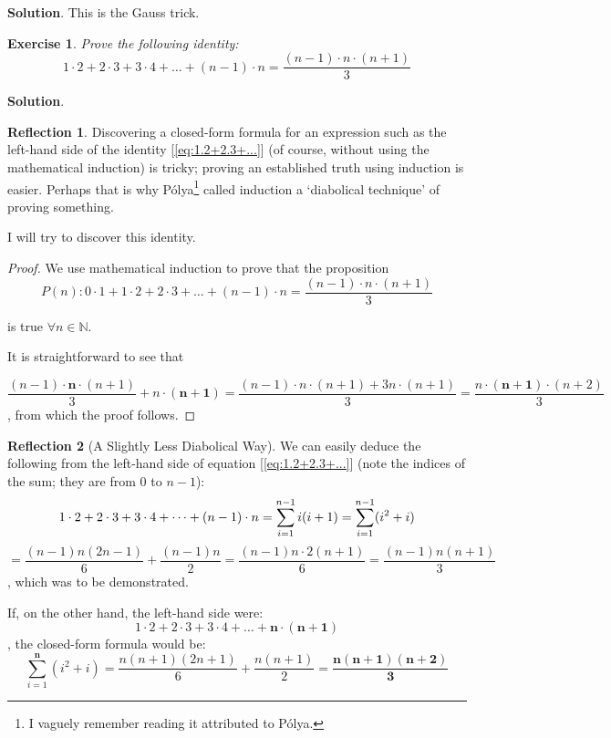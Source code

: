 \documentclass[11pt]{book}
\theoremstyle{definition}
\theoremstyle{plain}
\newtheorem{exercise}{Exercise}
\theoremstyle{definition}
\theoremstyle{problemstyle}
\theoremstyle{remark}
\theoremstyle{definition}
\newtheorem{reflection}{Reflection}
\begin{document}
\textbf{Solution}.
This is the Gauss trick.
\begin{exercise}
    \label{ex:2.1.5}
    Prove the following identity:
    \begin{equation}
        \label{eq:1.2+2.3+...}
        1\cdot2+2\cdot3+3\cdot4+\dots+(n-1)\cdot n=\frac{(n-1)\cdot n\cdot(n+1)}{3}
    \end{equation}
\end{exercise}
\textbf{Solution}.
\begin{reflection}
    Discovering a closed-form formula for an expression such as the left-hand side of the identity [\ref{eq:1.2+2.3+...}] (of course, without using the mathematical induction) is tricky; proving an established truth using induction is easier. Perhaps that is why P\'olya\footnote{I vaguely remember reading it attributed to P\'olya.} called induction a `diabolical technique' of proving something. 

    I will try to discover this identity.
\end{reflection}
\begin{proof}
    We use mathematical induction to prove that the proposition 
    \[
        P(n):0\cdot1+1\cdot2+2\cdot3+\dots+(n-1)\cdot n=\frac{(n-1)\cdot n\cdot(n+1)}{3}
    \]

    is true $\forall n\in\mathbb{N}$.

    It is straightforward to see that

    \[
        \frac{(n-1)\cdot\boldsymbol{n}\cdot(n+1)}{3}+n\cdot\boldsymbol{(n+1)}=\frac{(n-1)\cdot n\cdot(n+1)+3n\cdot(n+1)}{3}=\frac{n\cdot\boldsymbol{(n+1)}\cdot(n+2)}{3}
    \]
    , from which the proof follows.
\end{proof}

\begin{reflection}[A Slightly Less Diabolical Way]
    We can easily deduce the following from the left-hand side of equation [\ref{eq:1.2+2.3+...}] (note the indices of the sum; they are from $0$ to $n-1$):
    \begin{equation*}
        1\cdot2+2\cdot3+3\cdot4+\dots+(n-1)\cdot n=\sum_{i=1}^{n-1}i(i+1)=\sum_{i=1}^{n-1}(i^2+i)\\
    \end{equation*}
    \begin{equation*}
        =\frac{(n-1)n(2n-1)}{6}+\frac{(n-1)n}{2}=\frac{(n-1)n\cdot2(n+1)}{6}=\frac{(n-1)n(n+1)}{3}
    \end{equation*}, which was to be demonstrated.

    If, on the other hand, the left-hand side were:
    \[
        1\cdot2+2\cdot3+3\cdot4+\dots+\boldsymbol{n\cdot (n+1)}
    \]
    , the closed-form formula would be:
    \[
        \sum_{i=1}^{\boldsymbol{n}}(i^2+i)=\frac{n(n+1)(2n+1)}{6}+\frac{n(n+1)}{2}=\boldsymbol{\frac{n(n+1)(n+2)}{3}}
    \]
\end{reflection}
\end{document}
